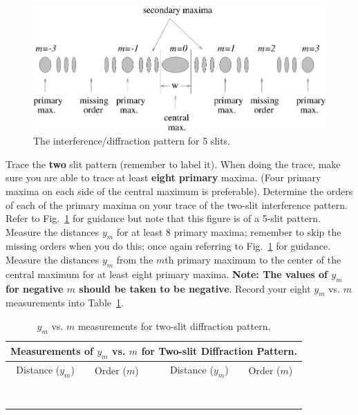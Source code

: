 \begin{figure}[htb]
\centering 
\epsfxsize=15cm \includegraphics[scale=0.6]{10_diffraction/interpatt.eps}
\caption{The interference/diffraction pattern for 5 slits.}
\label{fig:diff:interpatt}
\end{figure}

\noindent Trace the {\bf two} slit pattern (remember to label it). 
When doing the trace,
make sure you are able to trace at least {\bf eight primary} maxima. (Four
primary maxima on each side of the central maximum is preferable).
Determine the orders of each of the primary maxima on your trace of
the two-slit interference pattern. Refer to Fig.~\ref{fig:diff:interpatt}
for guidance but note that this figure is of a 5-slit pattern.
Measure the distances $y_m$ for at least 8 primary maxima; remember to skip
the missing orders when you do this; once again 
referring  to Fig.~\ref{fig:diff:interpatt} for guidance. \\

\noindent
Measure the distances $y_m$ from the $m$th primary maximum to the
center of the central maximum for at least eight primary maxima. {\bf
Note: The values of $y_m$ for negative $m$ should be taken to be
negative}. Record your eight $y_m$ vs. $m$ measurements into 
Table~\ref{tab:DI:twoslit}.

\begin{table}[htb]
\begin{center}
\begin{tabular}{|c|c|c|c|c|}
\hline
\multicolumn{5}{|c|}{Measurements of $y_m$ vs. $m$ for Two-slit Diffraction Pattern.} \\
\hline
Distance ($y_m$) & Order ($m$) & & Distance ($y_m$) & Order ($m$) \\
\hline
\hspace*{3cm} & \hspace*{3cm} & \hspace*{.3cm} & \hspace*{3cm} & \hspace*{3cm} \\
& & & & \\
\hline
& & & & \\ & & & & \\
\hline
& & & & \\ & & & & \\
\hline
& & & & \\ & & & & \\
\hline
\end{tabular}
\end{center}
\caption{$y_m$ vs. $m$ measurements for two-slit diffraction pattern.}
\label {tab:DI:twoslit}
\end{table}

